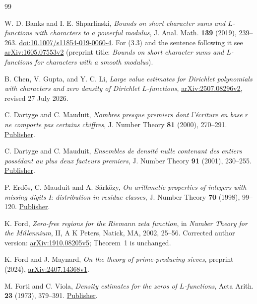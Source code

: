 \documentclass[11pt,a4paper]{article}
\theoremstyle{paperplain}
\numberwithin{equation}{section}
\begin{document}
\clearpage
{}
{}
\begin{thebibliography}{99}
\small\setlength{\itemsep}{3pt}\setlength{\parsep}{0pt}
\raggedright

W. D. Banks and I. E. Shparlinski,
\emph{Bounds on short character sums and \(L\)-functions with characters
to a powerful modulus}, J. Anal. Math. \textbf{139} (2019), 239--263.
\href{https://doi.org/10.1007/s11854-019-0060-4}{doi:10.1007/s11854-019-0060-4}.
For (3.3) and the sentence following it see \href{https://arxiv.org/abs/1605.07553v2}{arXiv:1605.07553v2} (preprint title: \emph{Bounds on short character sums and $L$-functions for characters with a smooth modulus}).

B. Chen, V. Gupta, and Y. C. Li,
\emph{Large value estimates for Dirichlet polynomials with characters and
zero density of Dirichlet $L$-functions},
\href{https://arxiv.org/abs/2507.08296v2}{arXiv:2507.08296v2}, revised 27 July 2026.

C. Dartyge and C. Mauduit, \emph{Nombres presque premiers dont
l'\'ecriture en base $r$ ne comporte pas certains chiffres},
J. Number Theory \textbf{81} (2000), 270--291.
\href{https://doi.org/10.1006/jnth.1999.2458}{Publisher}.

C. Dartyge and C. Mauduit, \emph{Ensembles de densit\'e nulle contenant
des entiers poss\'edant au plus deux facteurs premiers},
J. Number Theory \textbf{91} (2001), 230--255.
\href{https://doi.org/10.1006/jnth.2001.2681}{Publisher}.

P. Erd\H{o}s, C. Mauduit and A. S\'ark\"ozy,
\emph{On arithmetic properties of integers with missing digits I:
distribution in residue classes}, J. Number Theory \textbf{70} (1998), 99--120.
\href{https://doi.org/10.1006/jnth.1998.2229}{Publisher}.

K. Ford, \emph{Zero-free regions for the Riemann zeta function},
in \emph{Number Theory for the Millennium}, II,
A K Peters, Natick, MA, 2002, 25--56.
Corrected author version: \href{https://arxiv.org/abs/1910.08205v5}{arXiv:1910.08205v5}; Theorem~1 is unchanged.

K. Ford and J. Maynard,
\textit{On the theory of prime-producing sieves},
preprint (2024),
\href{https://arxiv.org/abs/2407.14368v1}{arXiv:2407.14368v1}.

M. Forti and C. Viola, \emph{Density estimates for the zeros of
$L$-functions}, Acta Arith. \textbf{23} (1973), 379--391.
\href{https://doi.org/10.4064/aa-23-4-379-391}{Publisher}.


\end{thebibliography}
\end{document}
